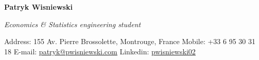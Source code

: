 \documentclass[11pt]{report}
\begin{document}
\hspace*{-\parindent}\hspace{-1em}
\begin{center}
\begin{Large}\textbf{Patryk Wisniewski\\}\end{Large}
\emph{Economics \& Statistics engineering student}
\end{center}\vspace{0.1cm}
	 Address: 155 Av. Pierre Brossolette, Montrouge, France \hfill Mobile: +33 6 95 30 31 18 
	 \newline E-mail: \href{mailto:patryk@pwisniewski.com}{\underline{patryk@pwisniewski.com}} \hfill
	 Linkedin: \href{https://linkedin.com/in/pwisniewski02}{\underline{pwisniewski02}}
\vspace{0.15cm}

\end{document}
